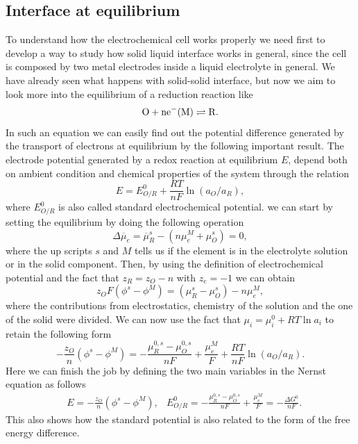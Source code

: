 \subsection{Interface at equilibrium}

To understand how the electrochemical cell works properly we need first to develop a way to study how solid liquid interface works in general, since the cell is composed by two metal electrodes inside a liquid electrolyte in general. We have already seen what happens with solid-solid interface, but now we aim to look more into the equilibrium of a reduction reaction like
\begin{equation}
    \ce{O + ne^-(M)} \rightleftharpoons  \ce{R}.
\end{equation}
In such an equation we can easily find out the potential difference generated by the transport of electrons at equilibrium by the following important result.
{
    The electrode potential generated by a redox reaction at equilibrium $E$, depend both on ambient condition and chemical properties of the system through the relation
    \begin{equation}
        E = E^0_{O/R} + \frac{RT}{nF}\ln(a_O/a_R),
    \end{equation}
    where $E^0_{O/R}$ is also called standard electrochemical potential.
}
{
    we can start by setting the equilibrium by doing the following operation
    \begin{equation}
        \Delta \overline{\mu}_e = \overline{\mu}_R^s - (n\mu_e^M + \mu_O^s) = 0,
    \end{equation}
    where the up scripts $s$ and $M$ tells us if the element is in the electrolyte solution or in the solid component. Then, by using the definition of electrochemical potential and the fact that $z_R = z_O - n$ with $z_e = -1$ we can obtain
    \begin{equation}
        \label{eq:potentialAtSolidLiquidInterface}
        z_OF(\phi^s - \phi^M) = (\mu_R^s - \mu_O^s) - n\mu_e^M,
    \end{equation}
    where the contributions from electrostatics, chemistry of the solution and the one of the solid were divided. We can now use the fact that $\mu_i = \mu_i^0 + RT\ln a_i$ to retain the following form
    \begin{equation}
        -\frac{z_O}{n}(\phi^s - \phi^M) = -\frac{\mu_R^{0,s} - \mu_O^{0,s}}{nF} + \frac{\mu_e^M}{F} + \frac{RT}{nF}\ln(a_O/a_R).
    \end{equation}
    Here we can finish the job by defining the two main variables in the Nernst equation as follows
    \begin{align}
        &E = -\frac{z_O}{n}(\phi^s - \phi^M), &E^0_{O/R} = -\frac{\mu_R^{0,s} - \mu_O^{0,s}}{nF} + \frac{\mu_e^M}{F} = -\frac{\Delta G^0}{nF}.
    \end{align}
    This also shows how the standard potential is also related to the form of the free energy difference.
}
